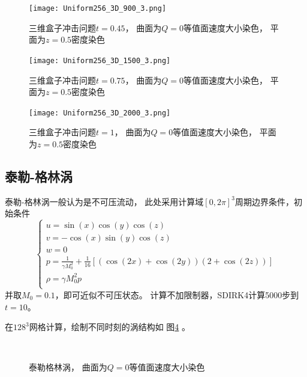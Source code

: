 \documentclass[UTF8,zihao=5]{ctexart} %
\begin{document}
\begin{figure}[htbp]
    \centering
    \texttt{[image: Uniform256\_3D\_900\_3.png]}  %
    \caption{三维盒子冲击问题$t=0.45$，
        曲面为$Q=0$等值面速度大小染色，
        平面为$z=0.5$密度染色}
    \label{fig:Uniform256_3D_900_3}
\end{figure}

\begin{figure}[htbp]
    \centering
    \texttt{[image: Uniform256\_3D\_1500\_3.png]}  %
    \caption{三维盒子冲击问题$t=0.75$，
        曲面为$Q=0$等值面速度大小染色，
        平面为$z=0.5$密度染色}
    \label{fig:Uniform256_3D_1500_3}
\end{figure}

\begin{figure}[htbp]
    \centering
    \texttt{[image: Uniform256\_3D\_2000\_3.png]}  %
    \caption{三维盒子冲击问题$t=1$，
        曲面为$Q=0$等值面速度大小染色，
        平面为$z=0.5$密度染色}
    \label{fig:Uniform256_3D_2000_3}
\end{figure}


\subsection{泰勒-格林涡}

泰勒-格林涡一般认为是不可压流动，
此处采用计算域$[0,2\pi]^3$周期边界条件，初始条件
$$
    \left\{
    \begin{array}{l}
        u = \sin(x) \cos(y) \cos(z)  \\
        v = -\cos(x) \sin(y) \cos(z) \\
        w = 0                        \\
        p = \frac{1}{\gamma M_0^2} + \frac{1}{16}\left[
            (\cos(2x) + \cos(2y)) (2 + \cos(2z))
        \right]                      \\
        \rho = \gamma M_0^2 p         \\
    \end{array}
    \right.
$$
并取$M_0=0.1$，即可近似不可压状态。
计算不加限制器，SDIRK4计算5000步到$t=10$。

在$128^3$网格计算，绘制不同时刻的涡结构如
图\ref{fig:Uniform128_3D_Periodic_TGV_5000}
。

\begin{figure}[htbp]
    \centering
    \\
    \caption{泰勒格林涡，
        曲面为$Q=0$等值面速度大小染色}
    \label{fig:Uniform128_3D_Periodic_TGV_5000}
\end{figure}
\end{document}
